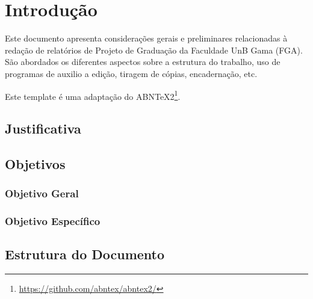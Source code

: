 \chapter[Introdução]{Introdução}

Este documento apresenta considerações gerais e preliminares relacionadas 
à redação de relatórios de Projeto de Graduação da Faculdade UnB Gama 
(FGA). São abordados os diferentes aspectos sobre a estrutura do trabalho, 
uso de programas de auxilio a edição, tiragem de cópias, encadernação, etc.

Este template é uma adaptação do ABNTeX2\footnote{\url{https://github.com/abntex/abntex2/}}.


\section{Justificativa}

\section{Objetivos}

    \subsection{Objetivo Geral}

    \subsection{Objetivo Específico}

\section{Estrutura do Documento}

